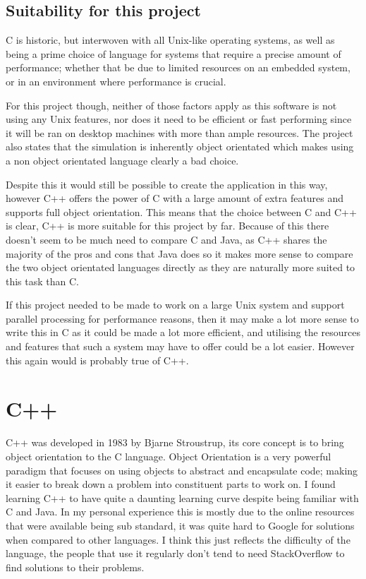 \documentclass[10pt]{article}
\begin{document}
  \subsection{Suitability for this project}
  C is historic, but interwoven with all Unix-like operating systems, as well as being a prime choice of language for systems that require a precise amount of performance; whether that be due to limited resources on an embedded system, or in an environment where performance is crucial.

  For this project though, neither of those factors apply as this software is not using any Unix features, nor does it need to be efficient or fast performing since it will be ran on desktop machines with more than ample resources. The project also states that the simulation is inherently object orientated\cite{assignment1} which makes using a non object orientated language clearly a bad choice. 

  Despite this it would still be possible to create the application in this way, however C++ offers the power of C with a large amount of extra features and supports full object orientation. This means that the choice between C and C++ is clear, C++ is more suitable for this project by far. Because of this there doesn't seem to be much need to compare C and Java, as C++ shares the majority of the pros and cons that Java does so it makes more sense to compare the two object orientated languages directly as they are naturally more suited to this task than C. 

  If this project needed to be made to work on a large Unix system and support parallel processing for performance reasons, then it may make a lot more sense to write this in C as it could be made a lot more efficient, and utilising the resources and features that such a system may have to offer could be a lot easier. However this again would is probably true of C++.

  \clearpage
  \section{C++}
  C++ was developed in 1983 by Bjarne Stroustrup, its core concept is to bring object orientation to the C language. Object Orientation is a very powerful paradigm that focuses on using objects to abstract and encapsulate code; making it easier to break down a problem into constituent parts to work on. I found learning C++ to have quite a daunting learning curve despite being familiar with C and Java. In my personal experience this is mostly due to the online resources that were available being sub standard, it was quite hard to Google for solutions when compared to other languages. I think this just reflects the difficulty of the language, the people that use it regularly don't tend to need StackOverflow to find solutions to their problems. 
\end{document}
